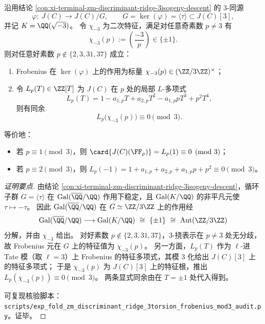 \begin{conclusion}\label{con:xi-terminal-zm-discriminant-ridge-3torsion-frobenius-mod3}
沿用结论 \ref{con:xi-terminal-zm-discriminant-ridge-3isogeny-descent} 的 \(3\)-同源
\[
\varphi:\ J(C)\longrightarrow J(C)/G,
\qquad
G=\ker(\varphi)=\langle \tau\rangle\subset J(C)[3],
\]
并记 \(K=\QQ(\sqrt{-3})\)。
令 \(\chi_{-3}\) 为二次特征，满足对任意奇素数 \(p\neq 3\) 有
\[
\chi_{-3}(p):=\left(\frac{-3}{p}\right)\in\{\pm1\}.
\]
则对任意好素数 \(p\notin\{2,3,31,37\}\) 成立：
\begin{enumerate}
  \item Frobenius 在 \(\ker(\varphi)\) 上的作用为标量 \(\chi_{-3}(p)\in(\ZZ/3\ZZ)^\times\)；
  \item 令 \(L_p(T)\in\ZZ[T]\) 为 \(J(C)\) 在 \(p\) 处的局部 \(L\)-多项式
  \[
  L_{p}(T)=1-a_{1,p}T+a_{2,p}T^{2}-a_{1,p}pT^{3}+p^{2}T^{4},
  \]
  则有同余
  \[
  L_p\bigl(\chi_{-3}(p)\bigr)\equiv 0\pmod 3.
  \]
\end{enumerate}
等价地：
\begin{itemize}
  \item 若 \(p\equiv 1\pmod 3\)，则 \(\card{J(C)(\FF_p)}=L_p(1)\equiv 0\pmod 3\)；
  \item 若 \(p\equiv 2\pmod 3\)，则
  \(
  L_p(-1)=1+a_{1,p}+a_{2,p}+a_{1,p}p+p^{2}\equiv 0\pmod 3
  \)。
\end{itemize}
\end{conclusion}
\begin{proof}[证明要点]
由结论 \ref{con:xi-terminal-zm-discriminant-ridge-3isogeny-descent}，循环子群 \(G=\langle\tau\rangle\) 在 \(\mathrm{Gal}(\overline{\QQ}/\QQ)\) 作用下稳定，且 \(\mathrm{Gal}(K/\QQ)\) 的非平凡元使 \(\tau\mapsto-\tau\)。
因此 \(\mathrm{Gal}(\overline{\QQ}/\QQ)\) 在 \(G\simeq \ZZ/3\ZZ\) 上的作用经
\[
\mathrm{Gal}(\overline{\QQ}/\QQ)\longrightarrow \mathrm{Gal}(K/\QQ)\ \cong\ \{\pm1\}\ \cong\ \mathrm{Aut}(\ZZ/3\ZZ)
\]
分解，并由 \(\chi_{-3}\) 给出。
对好素数 \(p\notin\{2,3,31,37\}\)，\(3\)-挠表示在 \(p\neq 3\) 处无分歧，故 Frobenius 元在 \(G\) 上的特征值为 \(\chi_{-3}(p)\)。
另一方面，\(L_p(T)\) 作为 \(\ell\)-进 Tate 模（取 \(\ell=3\)）上 Frobenius 的特征多项式，其模 \(3\) 化给出 \(J(C)[3]\) 上的特征多项式；
于是 \(\chi_{-3}(p)\) 为 \(J(C)[3]\) 上的特征根，推出 \(L_p(\chi_{-3}(p))\equiv 0\pmod 3\)。
两条显式同余由在 \(T=\pm1\) 处代入得到。

可复现核验脚本：\texttt{scripts/exp\_fold\_zm\_discriminant\_ridge\_3torsion\_frobenius\_mod3\_audit.py}。证毕。
\end{proof}

